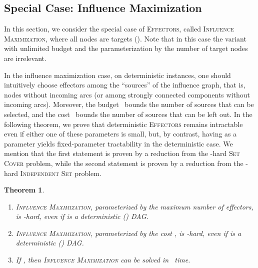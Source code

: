 \documentclass{article}
\newtheorem{theorem}{Theorem}
\newcommand{\probEffectors}{\textsc{Effectors}\xspace}
\begin{document}
\subsection{Special Case: Influence Maximization}\label{section:everythingActive}
In this section, we consider the special case of \probEffectors, called \textsc{Influence Maximization}, where all nodes are targets ().
Note that in this case the variant with unlimited budget and the
parameterization by the number of target nodes are irrelevant.

In the influence maximization case, on deterministic instances, one should intuitively choose 
effectors among the ``sources'' of the influence graph, that is, nodes 
without incoming arcs (or among strongly connected components without incoming arcs). 
Moreover, the budget~ bounds the number of sources that can be selected,
and the cost~ bounds the number of sources that can be left out. 
In the following theorem,
we prove that deterministic \probEffectors remains intractable even if either one of
these parameters is small,
but, by contrast,
having  as a parameter yields fixed-parameter tractability in the deterministic case.
We mention that the first statement is proven by a reduction from the -hard \textsc{Set Cover} problem,
while the second statement is proven by a reduction from the -hard \textsc{Independent Set} problem.

\begin{theorem}
  \label{thm:infmax}
  \mbox{}
  \begin{enumerate}
    \item \textsc{Influence Maximization},
      parameterized by the maximum number  of effectors,
      is -hard, even if  is a deterministic () DAG.
    \item \textsc{Influence Maximization},
      parameterized by the cost ,
      is -hard, even if  is a deterministic () DAG.
    \item If ,
      then \textsc{Influence Maximization} can be solved in~ time.
  \end{enumerate}
\end{theorem}
\end{document}

